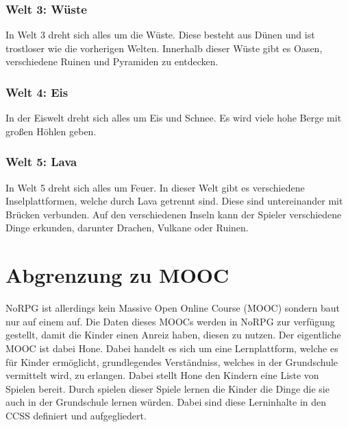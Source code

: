 \subsubsection{Welt 3: Wüste}
	In Welt 3 dreht sich alles um die Wüste. Diese besteht aus Dünen und ist trostloser wie die vorherigen Welten. Innerhalb dieser Wüste gibt es Oasen, verschiedene Ruinen und Pyramiden zu entdecken. 
	
\subsubsection{Welt 4: Eis}
	In der Eiswelt dreht sich alles um Eis und Schnee. Es wird viele hohe Berge mit großen Höhlen geben. 
	
\subsubsection{Welt 5: Lava}
	In Welt 5 dreht sich alles um Feuer. In dieser Welt gibt es verschiedene Inselplattformen, welche durch Lava getrennt sind. Diese sind untereinander mit Brücken verbunden. Auf den verschiedenen Inseln kann der Spieler verschiedene Dinge erkunden, darunter Drachen, Vulkane oder Ruinen. 
	

	
\section{Abgrenzung zu MOOC}

NoRPG ist allerdings kein Massive Open Online Course (MOOC) sondern baut nur auf einem auf. Die Daten dieses MOOCs werden in NoRPG zur verfügung gestellt, damit die Kinder einen Anreiz haben, diesen zu nutzen. Der eigentliche MOOC ist dabei Hone. Dabei handelt es sich um eine Lernplattform, welche es für Kinder ermöglicht, grundlegendes Verständniss, welches in der Grundschule vermittelt wird, zu erlangen. Dabei stellt Hone den Kindern eine Liste von Spielen bereit. Durch spielen dieser Spiele lernen die Kinder die Dinge die sie auch in der Grundschule lernen würden. Dabei sind diese Lerninhalte in den CCSS definiert und aufgegliedert.